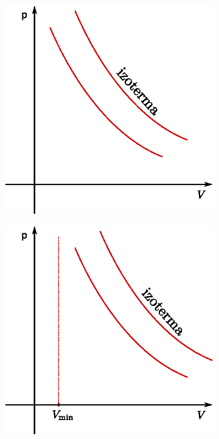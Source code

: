 \begin{figure}[htb]
    \centering
    \begin{subfigure}[t]{0.45\textwidth}
            \centering
            \includegraphics[width=\textwidth]{termo_4/termo_4_1}
            \label{fig:termo_4_1}
    \end{subfigure}\hfill
    \begin{subfigure}[t]{0.45\textwidth}
            \centering
            \includegraphics[width=\textwidth]{termo_4/termo_4_2}
            \label{fig:termo_4_2}
    \end{subfigure}
\end{figure}
